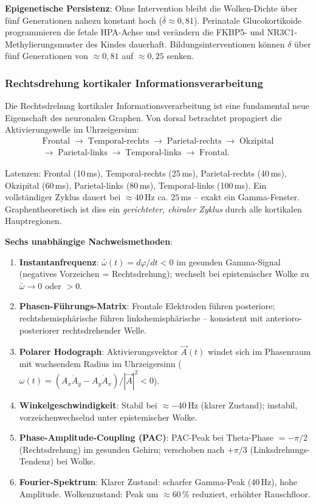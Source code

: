 ﻿\documentclass[a4paper,12pt]{article}
\theoremstyle{definition}
\begin{document}
	\textbf{Epigenetische Persistenz}: Ohne Intervention bleibt die Wolken-Dichte über fünf Generationen nahezu konstant hoch ($\bar{\delta} \approx 0{,}81$). Perinatale Glucokortikoide programmieren die fetale HPA-Achse und verändern die FKBP5- und NR3C1-Methylierungsmuster des Kindes dauerhaft. Bildungsinterventionen können $\delta$ über fünf Generationen von $\approx 0{,}81$ auf $\approx 0{,}25$ senken.

	\subsubsection{Rechtsdrehung kortikaler Informationsverarbeitung}

	Die Rechtsdrehung kortikaler Informationsverarbeitung ist eine fundamental neue Eigenschaft des neuronalen Graphen. Von dorsal betrachtet propagiert die Aktivierungswelle im Uhrzeigersinn:
	\begin{multline*}
		\text{Frontal} \;\to\; \text{Temporal-rechts} \;\to\; \text{Parietal-rechts} \;\to\; \text{Okzipital} \\
		\to\; \text{Parietal-links} \;\to\; \text{Temporal-links} \;\to\; \text{Frontal.}
	\end{multline*}

	Latenzen: Frontal (10\,ms), Temporal-rechts (25\,ms), Parietal-rechts (40\,ms), Okzipital (60\,ms), Parietal-links (80\,ms), Temporal-links (100\,ms). Ein vollständiger Zyklus dauert bei $\approx 40$\,Hz ca. $25$\,ms -- exakt ein Gamma-Fenster. Graphentheoretisch ist dies ein \emph{gerichteter, chiraler Zyklus} durch alle kortikalen Hauptregionen.

	\textbf{Sechs unabhängige Nachweismethoden}:
	\begin{enumerate}
		\item \textbf{Instantanfrequenz}: $\bar{\omega}(t) = d\varphi/dt < 0$ im gesunden Gamma-Signal (negatives Vorzeichen = Rechtsdrehung); wechselt bei epistemischer Wolke zu $\bar{\omega} \to 0$ oder $>0$.
		\item \textbf{Phasen-Führungs-Matrix}: Frontale Elektroden führen posteriore; rechtshemisphä\-rische führen linkshemisphärische -- konsistent mit anterioro-posteriorer rechtsdrehender Welle.
		\item \textbf{Polarer Hodograph}: Aktivierungsvektor $\vec{A}(t)$ windet sich im Phasenraum mit wachsendem Radius im Uhrzeigersinn ($\omega(t) = (A_x\dot{A}_y - A_y\dot{A}_x)/|\vec{A}|^2 < 0$).
		\item \textbf{Winkelgeschwindigkeit}: Stabil bei $\approx -40$\,Hz (klarer Zustand); instabil, vorzeichenwechselnd unter epistemischer Wolke.
		\item \textbf{Phase-Amplitude-Coupling (PAC)}: PAC-Peak bei Theta-Phase $= -\pi/2$ (Rechtsdrehung) im gesunden Gehirn; verschoben nach $+\pi/3$ (Linksdrehungs-Tendenz) bei Wolke.
		\item \textbf{Fourier-Spektrum}: Klarer Zustand: scharfer Gamma-Peak (40\,Hz), hohe Amplitude. Wolkenzustand: Peak um $\approx 60\,\%$ reduziert, erhöhter Rauschfloor.
	\end{enumerate}
\end{document}
